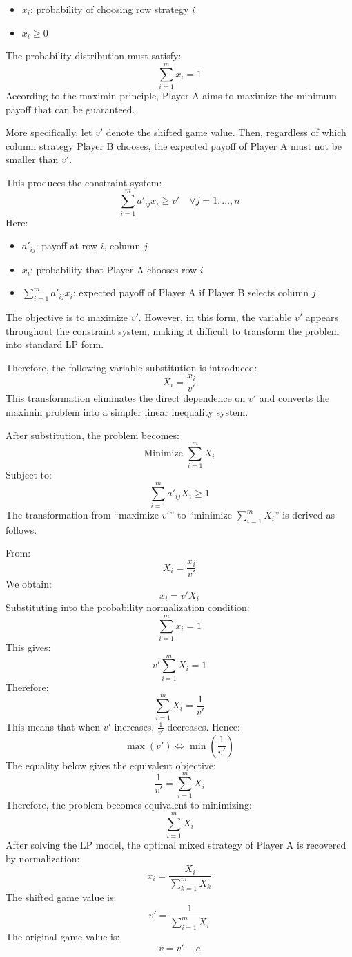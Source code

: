\documentclass[12pt,a4paper]{article}
\begin{document}
\begin{itemize}
    \item \(x_i\): probability of choosing row strategy \(i\)
    \item \(x_i \ge 0\)
\end{itemize}

The probability distribution must satisfy:
\vspace{0.1cm}
\[
\sum_{i=1}^{m}x_i=1
\]
\vspace{0.1cm}
According to the maximin principle, Player A aims to maximize the minimum payoff that can be guaranteed.

More specifically, let \(v'\) denote the shifted game value. Then, regardless of which column strategy Player B chooses, the expected payoff of Player A must not be smaller than \(v'\).

This produces the constraint system:
\vspace{0.1cm}
\[
\sum_{i=1}^{m}a'_{ij}x_i \ge v'
\quad \forall j=1,\dots,n
\]
Here:

\begin{itemize}
    \item \(a'_{ij}\): payoff at row \(i\), column \(j\)
    \item \(x_i\): probability that Player A chooses row \(i\)
    \item \(\sum_{i=1}^{m}a'_{ij}x_i\): expected payoff of Player A if Player B selects column \(j\).
\end{itemize}

The objective is to maximize \(v'\). However, in this form, the variable \(v'\) appears throughout the constraint system, making it difficult to transform the problem into standard LP form.

Therefore, the following variable substitution is introduced:
\[
X_i=\frac{x_i}{v'}
\]
This transformation eliminates the direct dependence on \(v'\) and converts the maximin problem into a simpler linear inequality system. \cite{thie2008}

After substitution, the problem becomes:
\[
\text{Minimize } \sum_{i=1}^{m}X_i
\]
Subject to:
\[
\sum_{i=1}^{m}a'_{ij}X_i \ge 1
\]
\vspace{0.1cm}
The transformation from ``maximize \(v'\)'' to ``minimize \(\sum_{i=1}^{m} X_i\)'' is derived as follows.

From:
\[
X_i=\frac{x_i}{v'}
\]
We obtain:
\[
x_i=v'X_i
\]
Substituting into the probability normalization condition:
\[
\sum_{i=1}^{m}x_i=1
\]
This gives:
\[
v'\sum_{i=1}^{m}X_i=1
\]
Therefore:
\[
\sum_{i=1}^{m}X_i=\frac1{v'}
\]
\vspace{0.1cm}
This means that when \(v'\) increases, \(\frac1{v'}\) decreases. Hence:
\[
\max(v') \iff \min\left(\frac1{v'}\right)
\]
The equality below gives the equivalent objective:
\[
\frac1{v'}=\sum_{i=1}^{m}X_i
\]
Therefore, the problem becomes equivalent to minimizing:
\[
\sum_{i=1}^{m}X_i
\]
After solving the LP model, the optimal mixed strategy of Player A is recovered by normalization:
\[
x_i=
\frac{X_i}
{\sum_{k=1}^{m}X_k}
\]
The shifted game value is:
\[
v'=
\frac1
{\sum_{i=1}^{m}X_i}
\]
The original game value is:
\[
v=v'-c
\]
\end{document}
